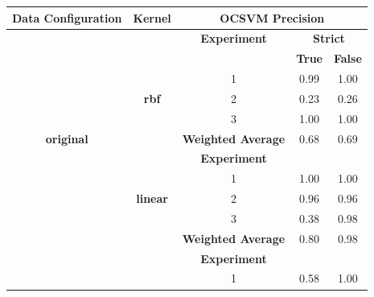 \documentclass{mpaper}
\begin{document}
\begin{table}[]
\centering
\begin{tabular}{|c|c|ccc|}
\hline
\textbf{Data Configuration} & \textbf{Kernel} & \multicolumn{3}{c|}{\textbf{OCSVM Precision}}                                         \\ \hline
\multicolumn{1}{|l|}{}      & \textbf{}       & \multicolumn{1}{c|}{\textbf{Experiment}}       & \multicolumn{2}{c|}{\textbf{Strict}} \\ \cline{3-5} 
                            &                 & \multicolumn{1}{l|}{}                          & \textbf{True}    & \textbf{False}    \\ \cline{3-5} 
                            &                 & \multicolumn{1}{c|}{1}                         & 0.99             & 1.00              \\
\multicolumn{1}{|l|}{}      & \textbf{rbf}    & \multicolumn{1}{c|}{2}                         & 0.23             & 0.26              \\
                            &                 & \multicolumn{1}{c|}{3}                         & 1.00             & 1.00              \\ \cline{3-5} 
\textbf{original}           &                 & \multicolumn{1}{c|}{\textbf{Weighted Average}} & 0.68             & 0.69              \\ \cline{2-5} 
                            &                 & \multicolumn{1}{c|}{\textbf{Experiment}}       & \textbf{}        & \textbf{}         \\ \cline{3-5} 
                            &                 & \multicolumn{1}{c|}{1}                         & 1.00             & 1.00              \\
                            & \textbf{linear} & \multicolumn{1}{c|}{2}                         & 0.96             & 0.96              \\
                            &                 & \multicolumn{1}{c|}{3}                         & 0.38             & 0.98              \\
                            \cline{3-5}
                            &                 & \multicolumn{1}{c|}{\textbf{Weighted Average}} & 0.80             & 0.98              \\ \hline
                            &                 & \multicolumn{1}{c|}{\textbf{Experiment}}       & \textbf{}        & \textbf{}         \\ \cline{3-5} 
                            &                 & \multicolumn{1}{c|}{1}                         & 0.58             & 1.00              \\

\end{tabular}
\end{table}
\end{document}
